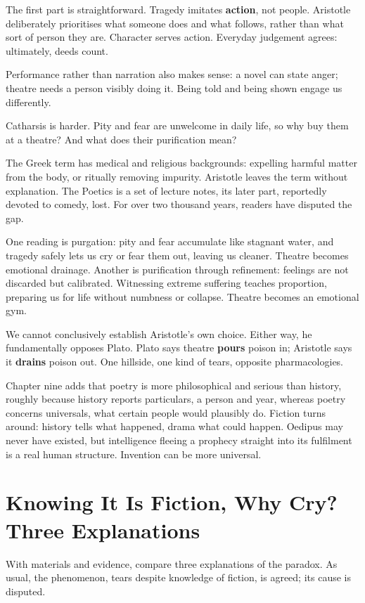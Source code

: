 The first part is straightforward. Tragedy imitates \textbf{action}, not people. Aristotle deliberately prioritises what someone does and what follows, rather than what sort of person they are. Character serves action. Everyday judgement agrees: ultimately, deeds count.

Performance rather than narration also makes sense: a novel can state anger; theatre needs a person visibly doing it. Being told and being shown engage us differently.

Catharsis is harder. Pity and fear are unwelcome in daily life, so why buy them at a theatre? And what does their purification mean?

The Greek term has medical and religious backgrounds: expelling harmful matter from the body, or ritually removing impurity. Aristotle leaves the term without explanation. The Poetics is a set of lecture notes, its later part, reportedly devoted to comedy, lost. For over two thousand years, readers have disputed the gap.

One reading is purgation: pity and fear accumulate like stagnant water, and tragedy safely lets us cry or fear them out, leaving us cleaner. Theatre becomes emotional drainage. Another is purification through refinement: feelings are not discarded but calibrated. Witnessing extreme suffering teaches proportion, preparing us for life without numbness or collapse. Theatre becomes an emotional gym.

We cannot conclusively establish Aristotle's own choice. Either way, he fundamentally opposes Plato. Plato says theatre \textbf{pours} poison in; Aristotle says it \textbf{drains} poison out. One hillside, one kind of tears, opposite pharmacologies.

Chapter nine adds that poetry is more philosophical and serious than history, roughly because history reports particulars, a person and year, whereas poetry concerns universals, what certain people would plausibly do. Fiction turns around: history tells what happened, drama what could happen. Oedipus may never have existed, but intelligence fleeing a prophecy straight into its fulfilment is a real human structure. Invention can be more universal.

\section[Fictional Events, Real Tears]{Knowing It Is Fiction, Why Cry? Three Explanations}
With materials and evidence, compare three explanations of the paradox. As usual, the phenomenon, tears despite knowledge of fiction, is agreed; its cause is disputed.

